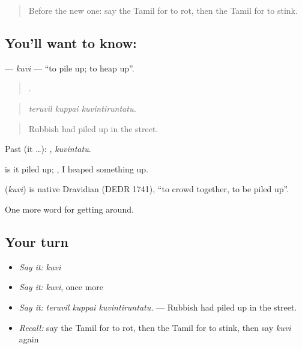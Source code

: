 \label{lesson:TA-C441-kuvi}



\begin{quote}
Before the new one: say the Tamil for to rot, then the Tamil for to stink.
\end{quote}

\subsection*{You'll want to know: }
\textbf{} — \emph{kuvi} — \textquotedblleft{}to pile up; to heap up\textquotedblright{}.

\begin{quote}
  .
\end{quote}

\begin{quote}
\emph{teruvil kuppai kuvintiruntatu.}
\end{quote}

\begin{quote}
Rubbish had piled up in the street.
\end{quote}

Past (it …): , \emph{kuvintatu}.

 is it piled up; , I heaped something up.

\begin{cousinweb}
\textbf{} (\emph{kuvi}) is native Dravidian (DEDR 1741), \textquotedblleft{}to crowd together, to be piled up\textquotedblright{}.
\end{cousinweb}

\begin{grammarlens}[title={What you've built}]
One more word for getting around.
\end{grammarlens}

\subsection*{Your turn}
\begin{itemize}
\raggedright
  \item \emph{Say it:} \emph{kuvi}
  \item \emph{Say it:} \emph{kuvi}, once more
  \item \emph{Say it:} \emph{teruvil kuppai kuvintiruntatu.} — Rubbish had piled up in the street.
  \item \emph{Recall:} say the Tamil for to rot, then the Tamil for to stink, then say \emph{kuvi} again
\end{itemize}

